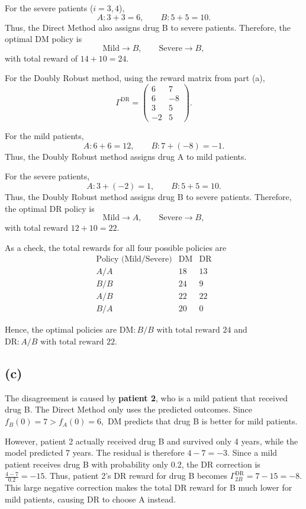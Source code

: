 \documentclass{article}
\begin{document}
For the severe patients ($i=3,4$),
\[
A: 3+3=6,
\qquad
B: 5+5=10.
\]
Thus, the Direct Method also assigns drug B to severe patients. Therefore, the optimal DM policy is
\[
\boxed{\text{Mild} \rightarrow B,
\qquad
\text{Severe} \rightarrow B,}
\]
with total reward of $ 14+10=24.$


For the Doubly Robust method, using the reward matrix from part (a),
\[
\Gamma^{\mathrm{DR}}
=
\begin{pmatrix}
6 & 7\\
6 & -8\\
3 & 5\\
-2 & 5
\end{pmatrix}.
\]

For the mild patients,
\[
A: 6+6=12,
\qquad
B: 7+(-8)=-1.
\]
Thus, the Doubly Robust method assigns drug A to mild patients.

For the severe patients,
\[
A: 3+(-2)=1,
\qquad
B: 5+5=10.
\]
Thus, the Doubly Robust method assigns drug B to severe patients. Therefore, the optimal DR policy is
\[
\boxed{
\text{Mild} \rightarrow A,
\qquad
\text{Severe} \rightarrow B,}
\]
with total reward $
12+10=22.
$

As a check, the total rewards for all four possible policies are
\[
\begin{array}{c|cc}
\text{Policy (Mild/Severe)} & \mathrm{DM} & \mathrm{DR}\\
\hline
A/A & 18 & 13\\
B/B & 24 & 9\\
A/B & 22 & 22\\
B/A & 20 & 0
\end{array}
\]

Hence, the optimal policies are $
\boxed{\mathrm{DM}: B/B \text{ with total reward }24}
$ and $
\boxed{\mathrm{DR}: A/B \text{ with total reward }22}.
$


\vspace{5mm}
\subsection*{(c)}


The disagreement is caused by \textbf{patient 2}, who is a mild patient that received drug B. The Direct Method only uses the predicted outcomes. Since $
f_B(0)=7 > f_A(0)=6,
$ DM predicts that drug B is better for mild patients.

However, patient 2 actually received drug B and survived only 4 years, while the model predicted 7 years. The residual is therefore $
4-7=-3. $ Since a mild patient receives drug B with probability only $0.2$, the DR correction is $
\frac{4-7}{0.2}=-15.
$ Thus, patient 2's DR reward for drug B becomes
$ \Gamma^{\mathrm{DR}}_{2B}
=
7-15
=
-8.
$
This large negative correction makes the total DR reward for B much lower for mild patients, causing DR to choose A instead.
\end{document}
